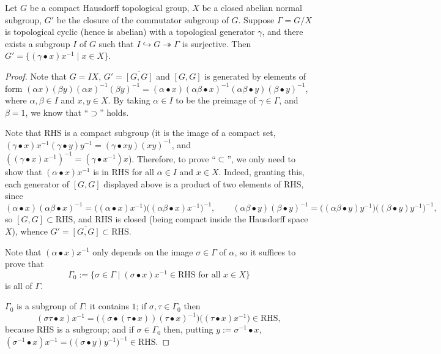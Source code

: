 \begin{lem}
\label{commutator-eq}
\leanok
Let $G$ be a compact Hausdorff
topological group, $X$ be a closed abelian normal subgroup,
$G'$ be the closure of the commutator subgroup of $G$.
Suppose $\Gamma=G/X$ is topological cyclic (hence is abelian)
with a topological generator $\gamma$,
and there exists a subgroup $I$ of $G$
such that $I\hookrightarrow G\twoheadrightarrow\Gamma$ is surjective.
Then $G'=\{(\gamma\bullet x)x^{-1}\mid x\in X\}$.
\end{lem}

\begin{proof}
\leanok
Note that $G=IX$, $G'=\overline{[G,G]}$
and $[G,G]$ is generated by elements of form
$(\alpha x)(\beta y)(\alpha x)^{-1}(\beta y)^{-1}
=(\alpha\bullet x)(\alpha\beta\bullet x)^{-1}(\alpha\beta\bullet y)(\beta\bullet y)^{-1}$,
where $\alpha,\beta\in I$ and $x,y\in X$.
By taking $\alpha\in I$ to be the preimage of $\gamma\in\Gamma$, and $\beta=1$,
we know that ``$\supset$'' holds.

Note that RHS is a compact subgroup
(it is the image of a compact set,
$(\gamma\bullet x)x^{-1}(\gamma\bullet y)y^{-1}
=(\gamma\bullet xy)(xy)^{-1}$,
and $((\gamma\bullet x)x^{-1})^{-1}
=(\gamma\bullet x^{-1})x$).
Therefore, to prove ``$\subset$'', we only need to show that
$(\alpha\bullet x)x^{-1}$ is in RHS for all $\alpha\in I$ and $x\in X$.
Indeed, granting this, each generator of $[G,G]$ displayed above is a product of
two elements of RHS, since
$$(\alpha\bullet x)(\alpha\beta\bullet x)^{-1}
=\big((\alpha\bullet x)x^{-1}\big)\big((\alpha\beta\bullet x)x^{-1}\big)^{-1},
\qquad
(\alpha\beta\bullet y)(\beta\bullet y)^{-1}
=\big((\alpha\beta\bullet y)y^{-1}\big)\big((\beta\bullet y)y^{-1}\big)^{-1},$$
so $[G,G]\subset\text{RHS}$, and RHS is closed (being compact inside the
Hausdorff space $X$), whence $G'=\overline{[G,G]}\subset\text{RHS}$.

Note that $(\alpha\bullet x)x^{-1}$ only depends on the image $\sigma\in\Gamma$ of
$\alpha$, so it suffices to prove that
$$\Gamma_0:=\{\sigma\in\Gamma\mid(\sigma\bullet x)x^{-1}\in\text{RHS}
\text{ for all }x\in X\}$$
is all of $\Gamma$.

$\Gamma_0$ is a subgroup of $\Gamma$: it contains $1$; if $\sigma,\tau\in\Gamma_0$
then
$$(\sigma\tau\bullet x)x^{-1}
=\big((\sigma\bullet(\tau\bullet x))(\tau\bullet x)^{-1}\big)
\big((\tau\bullet x)x^{-1}\big)\in\text{RHS},$$
because RHS is a subgroup; and if $\sigma\in\Gamma_0$ then, putting
$y:=\sigma^{-1}\bullet x$,
$(\sigma^{-1}\bullet x)x^{-1}=\big((\sigma\bullet y)y^{-1}\big)^{-1}\in\text{RHS}$.


\end{proof}
